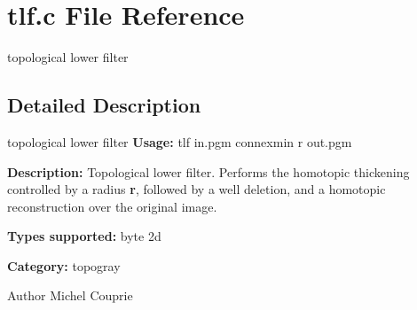\section{tlf.c File Reference}
\label{tlf_8c}


topological lower filter  




\subsection{Detailed Description}
topological lower filter {\bfseries Usage:} tlf in.pgm connexmin r out.pgm

{\bfseries Description:} Topological lower filter. Performs the homotopic thickening controlled by a radius {\bfseries r}, followed by a well deletion, and a homotopic reconstruction over the original image.

{\bfseries Types supported:} byte 2d

{\bfseries Category:} topogray

\begin{DoxyAuthor}{Author}
Michel Couprie 
\end{DoxyAuthor}
